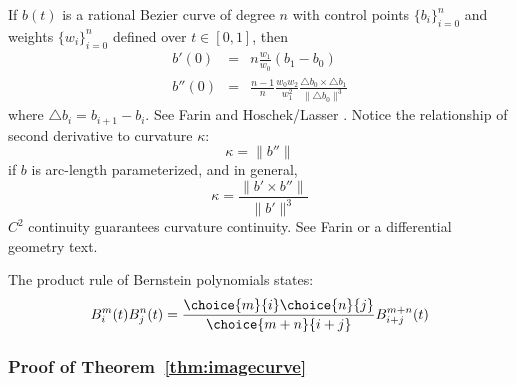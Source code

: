 \documentclass[11pt]{article}
\begin{document}
If $b(t)$ is a rational Bezier curve of degree $n$ 
with control points $\{b_i\}_{i=0}^n$ and 
weights $\{w_i\}_{i=0}^n$ defined over $t \in [0,1]$, then 
\begin{eqnarray}
\label{eqn:firstderiv}
b'(0) & = & n \frac{w_1}{w_0} (b_1 - b_0) \\
\label{eqn:secondderiv}
b''(0) & = & \frac{n-1}{n} \frac{w_0 w_2}{w_1^2} 
             \frac{\triangle b_0 \times \triangle b_1}{\| \triangle b_0\|^3}
\end{eqnarray}
where $\triangle b_i = b_{i+1} - b_i$.
See Farin \cite{farin02} and Hoschek/Lasser \cite{hoschekLasser0?}. 
Notice the relationship of second derivative to curvature $\kappa$:
\[
    \kappa = \|b''\|
\]
if $b$ is arc-length parameterized, and in general,
\[
    \kappa = \frac{\| b' \times b'' \|}{\| b' \|^3}
\]
$C^2$ continuity guarantees curvature continuity.
See Farin \cite{farin02} or a differential geometry text.

The product rule of Bernstein polynomials \cite{farin02} states:
\[
B_i^m(t) B_j^n(t) = \frac{\choice{m}{i} \choice{n}{j}}{\choice{m+n}{i+j}} B_{i+j}^{m+n}(t)
\]

\subsubsection{Proof of Theorem~\ref{thm:imagecurve}}
\end{document}
